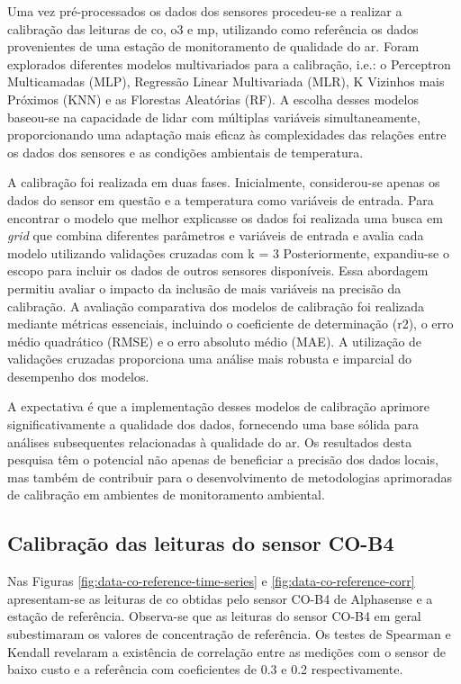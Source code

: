 Uma vez pré-processados os dados dos sensores procedeu-se a realizar a calibração das leituras de \acrshort{co}, \acrshort{o3} e \acrshort{mp}, utilizando como referência os dados provenientes de uma estação de monitoramento de qualidade do ar. Foram explorados diferentes modelos multivariados para a calibração, i.e.: o Perceptron Multicamadas (MLP), Regressão Linear Multivariada (MLR), K Vizinhos mais Próximos (KNN) e as Florestas Aleatórias (RF). A escolha desses modelos baseou-se na capacidade de lidar com múltiplas variáveis simultaneamente, proporcionando uma adaptação mais eficaz às complexidades das relações entre os dados dos sensores e as condições ambientais de temperatura.

A calibração foi realizada em duas fases. Inicialmente, considerou-se apenas os dados do sensor em questão e a temperatura como variáveis de entrada. Para encontrar o modelo que melhor explicasse os dados foi realizada uma busca em \textit{grid} que combina diferentes parâmetros e variáveis de entrada e avalia cada modelo utilizando validações cruzadas com k = 3 Posteriormente, expandiu-se o escopo para incluir os dados de outros sensores disponíveis. Essa abordagem permitiu avaliar o impacto da inclusão de mais variáveis na precisão da calibração. A avaliação comparativa dos modelos de calibração foi realizada mediante métricas essenciais, incluindo o coeficiente de determinação (r2), o erro médio quadrático (RMSE) e o erro absoluto médio (MAE). A utilização de validações cruzadas proporciona uma análise mais robusta e imparcial do desempenho dos modelos.

A expectativa é que a implementação desses modelos de calibração aprimore significativamente a qualidade dos dados, fornecendo uma base sólida para análises subsequentes relacionadas à qualidade do ar. Os resultados desta pesquisa têm o potencial não apenas de beneficiar a precisão dos dados locais, mas também de contribuir para o desenvolvimento de metodologias aprimoradas de calibração em ambientes de monitoramento ambiental.

\subsection{Calibração das leituras do sensor CO-B4}

Nas Figuras \ref{fig:data-co-reference-time-series} e \ref{fig:data-co-reference-corr} apresentam-se as leituras de \acrshort{co} obtidas pelo sensor CO-B4 de Alphasense e a estação de referência. Observa-se que as leituras do sensor CO-B4 em geral subestimaram os valores de concentração de referência. Os testes de Spearman e Kendall revelaram a existência de correlação entre as medições com o sensor de baixo custo e a referência com coeficientes de 0.3 e 0.2 respectivamente.

